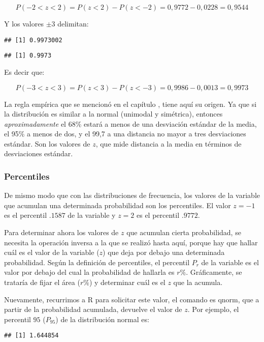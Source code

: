 \documentclass[]{article}
\begin{document}
\[P(- 2 < z < 2) = P(z < 2) - P(z < - 2) = 0,9772 - 0,0228 = 0,9544\]

Y los valores \(\pm3\) delimitan:

\begin{verbatim}
## [1] 0.9973002
\end{verbatim}

\begin{verbatim}
## [1] 0.9973
\end{verbatim}

Es decir que:

\[P(- 3 < z < 3) = P(z < 3) - P(z < - 3) = 0,9986 - 0,0013 = 0,9973\]

La regla empírica que se mencionó en el capítulo , tiene aquí su origen.
Ya que si la distribución es similar a la normal (unimodal y simétrica),
entonces \emph{aproximadamente} el 68\% estará a menos de una desviación
estándar de la media, el 95\% a menos de dos, y el 99,7 a una distancia
no mayor a tres desviaciones estándar. Son los valores de \(z\), que
mide distancia a la media en términos de desviaciones estándar.

\hypertarget{percentiles}{%
\subsubsection{Percentiles}\label{percentiles}}

De mismo modo que con las distribuciones de frecuencia, los valores de
la variable que acumulan una determinada probabilidad son los
percentiles. El valor \(z=-1\) es el percentil \(.1587\) de la variable
y \(z=2\) es el percentil \(.9772\).

Para determinar ahora los valores de \(z\) que acumulan cierta
probabilidad, se necesita la operación inversa a la que se realizó hasta
aquí, porque hay que hallar cuál es el valor de la variable (\(z\)) que
deja por debajo una determinada probabilidad. Según la definición de
percentiles, el percentil \(P_{r}\) de la variable es el valor por
debajo del cual la probabilidad de hallarla es \(r\%\). Gráficamente, se
trataría de fijar el área (\(r\%\)) y determinar cuál es el \(z\) que la
acumula.

Nuevamente, recurrimos a R para solicitar este valor, el comando es
qnorm, que a partir de la probabilidad acumulada, devuelve el valor de
\(z\). Por ejemplo, el percentil \(95\) (\(P_{95}\)) de la distribución
normal es:

\begin{verbatim}
## [1] 1.644854
\end{verbatim}
\end{document}
